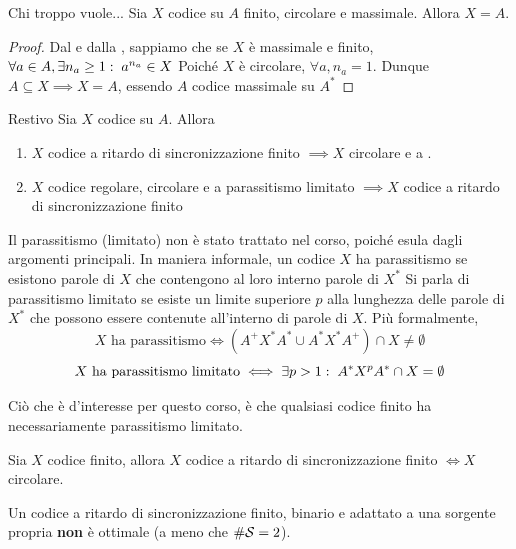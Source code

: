 \begin{proposition}{Chi troppo vuole...}
  Sia \(X\) codice su \(A\) finito, circolare e massimale. Allora \(X = A\).
\end{proposition}

\begin{proof}
  Dal  e dalla , sappiamo che se \(X\) è massimale e finito, \(\forall a \in A, \exists n_a \geq 1 :\; a^{n_a} \in X\)
  Poiché \(X\) è circolare, \(\forall a, n_a = 1\).
  Dunque \(A \subseteq X \implies X = A\), essendo \(A\) codice massimale su \(A^*\)
\end{proof}

\begin{theorem}{Restivo}
  Sia \(X\) codice su \(A\). Allora
  \begin{enumerate}
    \item \(X\) codice a ritardo di sincronizzazione finito \(\implies X\) circolare e a .
    \item \(X\) codice regolare, circolare e a parassitismo limitato \(\implies X\) codice a ritardo di sincronizzazione finito
  \end{enumerate}
\end{theorem}

\begin{note}{}
  Il parassitismo (limitato) non è stato trattato nel corso, poiché esula dagli argomenti principali.
  In maniera informale, un codice \(X\) ha parassitismo se esistono parole di \(X\) che contengono al loro interno parole di \(X^*\)
  Si parla di parassitismo limitato se esiste un limite superiore \(p\) alla lunghezza delle parole di \(X^*\) che possono essere contenute all'interno di parole di \(X\).
  Più formalmente,
  \[X \text{ ha parassitismo} \iff (A^+X^* A^*\cup A^*X^*A^+) \cap X \neq \emptyset\]
  \[X \text{ ha parassitismo limitato} \iff \exists p > 1 :\; A^*X^p A^* \cap X = \emptyset\]

  Ciò che è d'interesse per questo corso, è che qualsiasi codice finito ha necessariamente parassitismo limitato.
\end{note}

\begin{corollary}{}
  Sia \(X\) codice finito, allora \(X\) codice a ritardo di sincronizzazione finito \(\iff X\) circolare.
\end{corollary}

\begin{corollary}{}
  Un codice a ritardo di sincronizzazione finito, binario e adattato a una sorgente propria \textbf{non} è ottimale (a meno che \(\# \mathcal{S} = 2\)).
\end{corollary}

